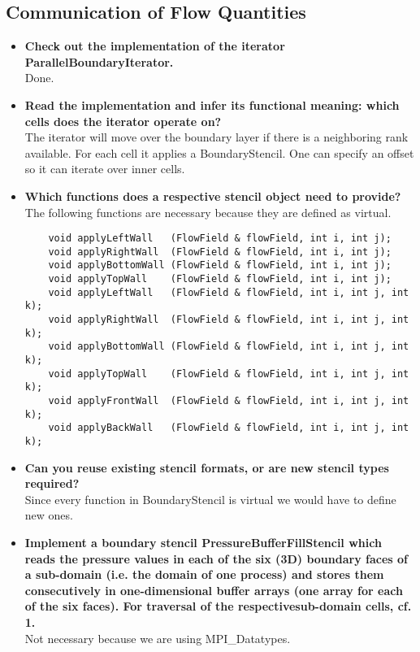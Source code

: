 \documentclass[a4paper]{article}
\begin{document}
\subsection{Communication of Flow Quantities}
\begin{itemize}
	\item \textbf{Check out the implementation of the iterator ParallelBoundaryIterator.}\\
	Done.
	\item \textbf{Read the implementation and infer its functional meaning: which cells does the iterator operate on?}\\
	The iterator will move over the boundary layer if there is a neighboring rank available. For each cell it applies a BoundaryStencil. One can specify an offset so it can iterate over inner cells.
	\item \textbf{Which functions does a respective stencil object need to provide?}\\
	The following functions are necessary because they are defined as virtual.
	\begin{lstlisting}
	void applyLeftWall   (FlowField & flowField, int i, int j);
	void applyRightWall  (FlowField & flowField, int i, int j);
	void applyBottomWall (FlowField & flowField, int i, int j);
	void applyTopWall    (FlowField & flowField, int i, int j);
	void applyLeftWall   (FlowField & flowField, int i, int j, int k);
	void applyRightWall  (FlowField & flowField, int i, int j, int k);
	void applyBottomWall (FlowField & flowField, int i, int j, int k);
	void applyTopWall    (FlowField & flowField, int i, int j, int k);
	void applyFrontWall  (FlowField & flowField, int i, int j, int k);
	void applyBackWall   (FlowField & flowField, int i, int j, int k);
	\end{lstlisting}
	
	\item \textbf{Can you reuse existing stencil formats, or are new stencil types required?}\\
	Since every function in BoundaryStencil is virtual we would have to define new ones.
	
	\item \textbf{Implement a boundary stencil PressureBufferFillStencil which reads the pressure values in each of the six (3D) boundary faces of a sub-domain (i.e. the domain of one process) and stores them consecutively in one-dimensional buffer arrays (one array for each of the six faces). For traversal of the respectivesub-domain cells, cf. 1.}\\
	Not necessary because we are using MPI\_Datatypes.
	

\end{itemize}
\end{document}
